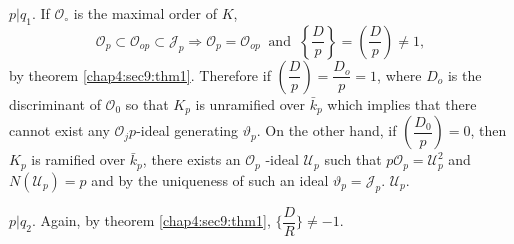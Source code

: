 \begin{case}[(ii) ]
  $ p | q_1 $. If $ \mathscr{O}_\circ $ is the maximal order of $K$,
  $$
  \mathscr{O}_p \subset \mathscr{O}_{op} \subset \mathcal{J}_p
  \Rightarrow \mathscr{O}_p = \mathscr{O}_{op}  ~\text{ and }~ \left\{
  \frac{D}{p} \right\} = \left( \frac{D}{p} \right) \neq 1,  
  $$
  by theorem \ref{chap4:sec9:thm1}. Therefore if $ \left( \dfrac{D}{p} \right) = \dfrac{D_o}{p} = 1
  $, where $D_o $ is the discriminant of  $ \mathscr{O}_0 $ so that
  $K_p$  is unramified over $ \bar{k}_p $ which implies that there
  cannot exist any  $ \mathscr{O}_jp $-ideal generating  $
  \vartheta_p $. On the other hand, if $ \left( \dfrac{D_0}{p}\right)
  = 0 $, then 
  $K_p $ is ramified over $ \bar{k}_p $, there exists an  $
  \mathscr{O}_p $ -ideal $ \mathscr{U}_p $ such that $ p \mathscr{O}_p
  = \mathcal{U}^2_p $  and $ N ( \mathscr{U}_p ) = p $ and by the
  uniqueness of such an ideal $ \vartheta_p = \mathcal{J}_p $. $
  \mathscr{U}_p $. 
\end{case}

\begin{case}[(iii) ]
  $ p | q_2 $. Again, by theorem \ref{chap4:sec9:thm1}, $\bigg\{ \dfrac{D}{R}\bigg \}  \neq -1$. 
\end{case}

